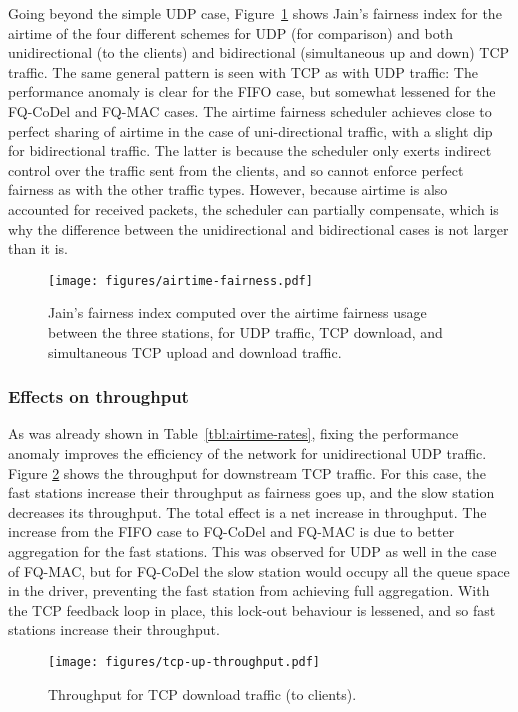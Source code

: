 \documentclass[english]{scrartcl}
\begin{document}
Going beyond the simple UDP case, Figure \ref{fig:airtime-fairness} shows Jain's
fairness index for the airtime of the four different schemes for UDP (for
comparison) and both unidirectional (to the clients) and bidirectional
(simultaneous up and down) TCP traffic. The same general pattern is seen with
TCP as with UDP traffic: The performance anomaly is clear for the FIFO case, but
somewhat lessened for the FQ-CoDel and FQ-MAC cases. The airtime fairness
scheduler achieves close to perfect sharing of airtime in the case of
uni-directional traffic, with a slight dip for bidirectional traffic. The latter
is because the scheduler only exerts indirect control over the traffic sent from
the clients, and so cannot enforce perfect fairness as with the other traffic
types. However, because airtime is also accounted for received packets, the
scheduler can partially compensate, which is why the difference between the
unidirectional and bidirectional cases is not larger than it is.

\begin{figure}[htbp]
\centering
\texttt{[image: figures/airtime-fairness.pdf]}
\caption{\label{fig:airtime-fairness}
Jain's fairness index computed over the airtime fairness usage between the three stations, for UDP traffic, TCP download, and simultaneous TCP upload and download traffic.}
\end{figure}

\subsubsection{Effects on throughput}
\label{sec:org7f142ff}
As was already shown in Table \ref{tbl:airtime-rates}, fixing the performance
anomaly improves the efficiency of the network for unidirectional UDP traffic.
Figure \ref{fig:throughput-tcp-up} shows the throughput for downstream TCP traffic.
For this case, the fast stations increase their throughput as fairness goes up,
and the slow station decreases its throughput. The total effect is a net
increase in throughput. The increase from the FIFO case to FQ-CoDel and FQ-MAC
is due to better aggregation for the fast stations. This was observed for UDP as
well in the case of FQ-MAC, but for FQ-CoDel the slow station would occupy all
the queue space in the driver, preventing the fast station from achieving full
aggregation. With the TCP feedback loop in place, this lock-out behaviour is
lessened, and so fast stations increase their throughput.

\begin{figure}[htbp]
\centering
\texttt{[image: figures/tcp-up-throughput.pdf]}
\caption{\label{fig:throughput-tcp-up}
Throughput for TCP download traffic (to clients).}
\end{figure}
\end{document}
